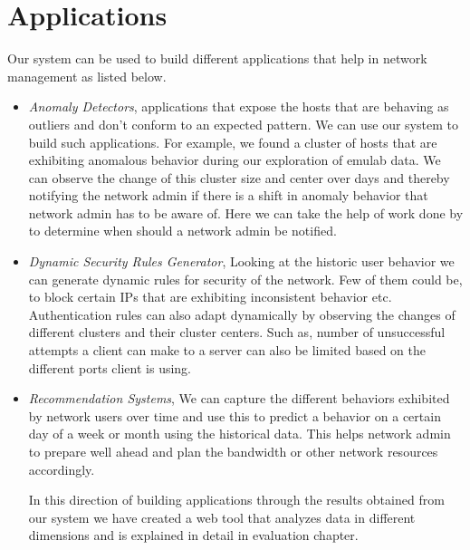 \section{Applications} \label{applications}
Our system can be used to build different applications that help in network management as listed below.
\begin{itemize}
	
	\item \textit{Anomaly Detectors}, applications that expose the hosts that are behaving as outliers and don't conform to an expected pattern. We can use our system to build such applications. For example, we found a cluster of hosts that are exhibiting anomalous behavior during our exploration of  emulab data. We can observe the change of this cluster size and center over days and thereby notifying the network admin if there is a shift in anomaly behavior that network admin has to be aware of. Here we can take the help of  work done by \cite{DBLP:journals/corr/DeyRS17} to determine when should a network admin be notified. 
	
	\item \textit{Dynamic Security Rules Generator}, Looking at the historic user behavior we can generate dynamic rules for security of the network. Few of them could be, to block certain IPs that are exhibiting inconsistent behavior etc. Authentication rules can also adapt dynamically by observing the changes of different clusters and their cluster centers. Such as, number of unsuccessful attempts a client can make to a server can also be limited based on the different ports client is using.
	
	\item \textit{Recommendation Systems}, We can capture the different behaviors exhibited by network users over time and use this to predict a behavior on a certain day of a week or month using the historical data. This helps network admin to prepare well ahead and plan the bandwidth or other network resources accordingly.
	
	In this direction of building applications through the results obtained from our system we have created a web tool that analyzes data in different dimensions and is explained in detail in evaluation chapter.

\end{itemize}


 




